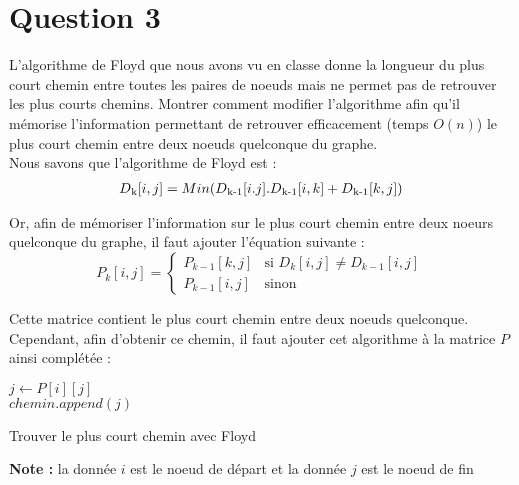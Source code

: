 \documentclass[devoir3.tex]{subfiles}
\begin{document}
\section*{Question 3}
L’algorithme de Floyd que nous avons vu en classe donne la longueur du plus court chemin entre toutes les paires de noeuds mais ne permet pas de retrouver les plus courts chemins. Montrer comment modifier l’algorithme afin qu’il mémorise l’information permettant de retrouver efficacement (temps \(O(n)\)) le plus court chemin entre deux noeuds quelconque du graphe. \\

Nous savons que l'algorithme de Floyd est : \\
\begin{align*}
	D\textsubscript{k}[i,j] = Min(D\textsubscript{k-1}[i.j]. D\textsubscript{k-1}[i,k] + D\textsubscript{k-1}[k,j])
\end{align*}

Or, afin de mémoriser l'information sur le plus court chemin entre deux noeurs quelconque du graphe, il faut ajouter l'équation suivante : \\

\[P_k[i,j] = \begin{cases}
    P_{k-1}[k,j] & \text{si } D_k[i,j] \neq D_{k-1}[i,j] \\
	P_{k-1}[i,j] & \text{sinon }
\end{cases}\]

Cette matrice contient le plus court chemin entre deux noeuds quelconque. Cependant, afin d'obtenir ce chemin, il faut ajouter cet algorithme à la matrice \(P\) ainsi complétée : \\

\begin{algorithm}[H]


    {
    	\( j \gets P[i][j] \) \\
    	\(chemin.append(j)\)
    }   

      \caption{Trouver le plus court chemin avec Floyd} 
\end{algorithm}

\textbf{Note :} la donnée \(i\) est le noeud de départ et la donnée \(j\) est le noeud de fin
\end{document}
